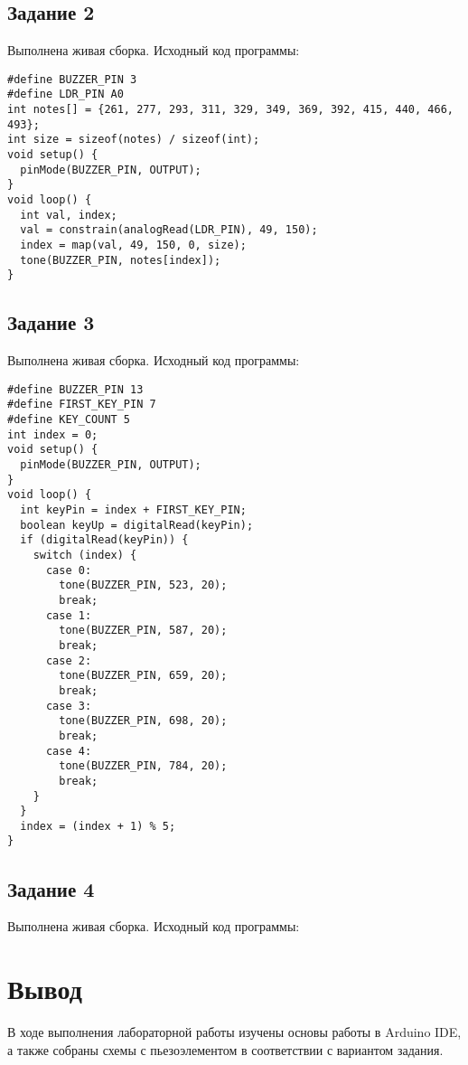 \documentclass[a4paper,14pt]{extarticle}
\begin{document}
  \subsection*{\hspace{12.5mm}Задание 2}
  Выполнена живая сборка. Исходный код программы:

  \begingroup
  \fontsize{14pt}{10pt}\selectfont
  \linespread{1}
  \begin{verbatim}
#define BUZZER_PIN 3
#define LDR_PIN A0
int notes[] = {261, 277, 293, 311, 329, 349, 369, 392, 415, 440, 466, 493};
int size = sizeof(notes) / sizeof(int);
void setup() {
  pinMode(BUZZER_PIN, OUTPUT);
}
void loop() {
  int val, index;
  val = constrain(analogRead(LDR_PIN), 49, 150);
  index = map(val, 49, 150, 0, size);
  tone(BUZZER_PIN, notes[index]);
}
  \end{verbatim}
  \endgroup

  \subsection*{\hspace{12.5mm}Задание 3}
  Выполнена живая сборка. Исходный код программы:

  \begingroup
  \fontsize{14pt}{10pt}\selectfont
  \linespread{1}
  \begin{verbatim}
#define BUZZER_PIN 13
#define FIRST_KEY_PIN 7
#define KEY_COUNT 5
int index = 0;
void setup() {
  pinMode(BUZZER_PIN, OUTPUT);
}
void loop() {
  int keyPin = index + FIRST_KEY_PIN;
  boolean keyUp = digitalRead(keyPin);
  if (digitalRead(keyPin)) {
    switch (index) {
      case 0:
        tone(BUZZER_PIN, 523, 20);
        break;
      case 1:
        tone(BUZZER_PIN, 587, 20);
        break;
      case 2:
        tone(BUZZER_PIN, 659, 20);
        break;
      case 3:
        tone(BUZZER_PIN, 698, 20);
        break;
      case 4:
        tone(BUZZER_PIN, 784, 20);
        break;
    }
  }
  index = (index + 1) % 5;
}
  \end{verbatim}
  \endgroup

  \subsection*{\hspace{12.5mm}Задание 4}
  Выполнена живая сборка. Исходный код программы:

  \section*{\hspace{12.5mm}Вывод}
  В ходе выполнения лабораторной работы изучены основы работы в Arduino IDE, а также собраны схемы с пьезоэлементом в соответствии с вариантом задания.
\end{document}
